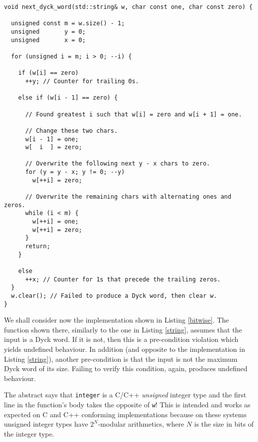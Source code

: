 \documentclass[a4paper]{article}
\begin{document}
\begin{lstlisting}[float,caption={String manipulation to generate a Dyck word.},label=string]
void next_dyck_word(std::string& w, char const one, char const zero) {
  
  unsigned const m = w.size() - 1;
  unsigned       y = 0;
  unsigned       x = 0;

  for (unsigned i = m; i > 0; --i) {

    if (w[i] == zero)
      ++y; // Counter for trailing 0s.

    else if (w[i - 1] == zero) {
      
      // Found greatest i such that w[i] = zero and w[i + 1] = one.
      
      // Change these two chars.
      w[i - 1] = one;
      w[  i  ] = zero;
      
      // Overwrite the following next y - x chars to zero.
      for (y = y - x; y != 0; --y)
        w[++i] = zero;
      
      // Overwrite the remaining chars with alternating ones and zeros.
      while (i < m) {
        w[++i] = one;
        w[++i] = zero;
      }
      return;
    }

    else
      ++x; // Counter for 1s that precede the trailing zeros.
  }
  w.clear(); // Failed to produce a Dyck word, then clear w.
}
\end{lstlisting}

We shall consider now the implementation shown in Listing \ref{bitwise}.
The function shown there, similarly to the one in Listing \ref{string}, assumes that the input is a Dyck word.
If it is not, then this is a pre-condition violation which yields undefined behaviour.
In addition (and opposite to the implementation in Listing \ref{string}), another pre-condition is that the input is not the maximum Dyck word of its size.
Failing to verify this condition, again, produces undefined behaviour.


The abstract says that \verb!integer! is a C/C++ {\em unsigned} integer type and the first line in the function's body takes the opposite of \verb!w!!
This is intended and works as expected on C and C++ conforming implementations because on these systems unsigned integer types have $2^N$-modular arithmetics, where $N$ is the size in bits of the integer type.
\end{document}
